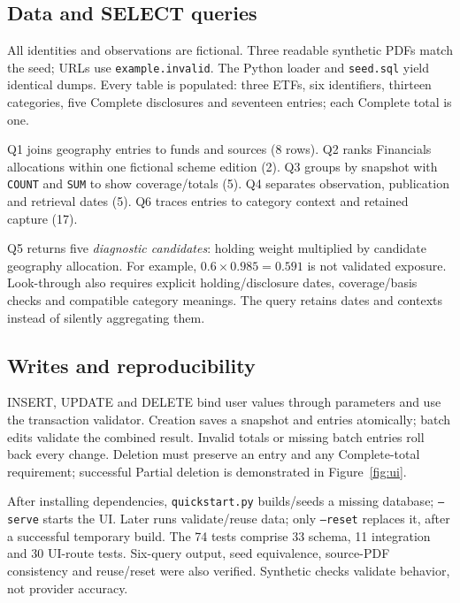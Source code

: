 \subsection{Data and SELECT queries}
All identities and observations are fictional. Three readable synthetic PDFs
match the seed; URLs use \nolinkurl{example.invalid}. The Python loader and
\texttt{seed.sql} yield identical dumps. Every table is populated: three ETFs,
six identifiers, thirteen categories, five Complete disclosures and seventeen
entries; each Complete total is one.

Q1 joins geography entries to funds and sources (8 rows). Q2 ranks Financials
allocations within one fictional scheme edition (2). Q3 groups by snapshot
with \texttt{COUNT} and \texttt{SUM} to show coverage/totals (5). Q4 separates
observation, publication and retrieval dates (5). Q6 traces entries to category
context and retained capture (17).

Q5 returns five \emph{diagnostic candidates}: holding weight multiplied by
candidate geography allocation. For example, $0.6\times0.985=0.591$ is not
validated exposure. Look-through also requires explicit holding/disclosure
dates, coverage/basis checks and compatible category meanings. The query
retains dates and contexts instead of silently aggregating them.

\subsection{Writes and reproducibility}
INSERT, UPDATE and DELETE bind user values through parameters and use the
transaction validator. Creation saves a snapshot and entries atomically; batch edits validate the
combined result. Invalid totals or missing batch entries roll back every change.
Deletion must preserve an entry and any Complete-total requirement; successful
Partial deletion is demonstrated in Figure~\ref{fig:ui}.

After installing dependencies, \texttt{quickstart.py} builds/seeds a missing
database; \texttt{--serve} starts the UI. Later runs validate/reuse data;
only \texttt{--reset} replaces it, after a successful temporary build.
The 74 tests comprise 33 schema, 11 integration and 30 UI-route tests.
Six-query output, seed equivalence, source-PDF consistency and reuse/reset
were also verified. Synthetic checks validate behavior, not provider accuracy.
